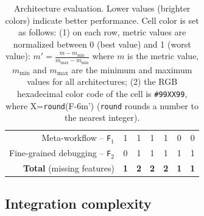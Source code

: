 \documentclass[preprint,3p,twocolumn]{elsarticle}
\newcommand{\correction}[1]{\color{blue}#1\color{black}\xspace}
\begin{document}
\begin{table}
\begin{tabular}{rcccccc}
  Meta-workflow  -- \texttt{\correction{F}$_1$}    & \cellcolor[HTML]{999999}1
                                     & \cellcolor[HTML]{999999}1
                                     & \cellcolor[HTML]{999999}\correction{1}
                                     & \cellcolor[HTML]{999999}1
                                     & \cellcolor[HTML]{99FF99}0
                                     & \cellcolor[HTML]{99FF99}0\\
  Fine-grained debugging -- \texttt{\correction{F}$_2$}   & \cellcolor[HTML]{99FF99}0
                                     & \cellcolor[HTML]{999999}1
                                     & \cellcolor[HTML]{999999}1
                                     & \cellcolor[HTML]{999999}1
                                     & \cellcolor[HTML]{999999}1
                                     & \cellcolor[HTML]{999999}1\\
  \textbf{Total} (missing features) & \cellcolor[HTML]{99FF99}\textbf{1}
                                     & \cellcolor[HTML]{999999}\textbf{2}
                                     & \cellcolor[HTML]{999999}\textbf{\correction{2}}
                                     & \cellcolor[HTML]{999999}\textbf{2}
                                     & \cellcolor[HTML]{99FF99}\textbf{1}
                                     & \cellcolor[HTML]{99FF99}\textbf{1}\\
\end{tabular}

\caption{Architecture evaluation. Lower values (brighter colors) indicate better performance. Cell color is set as follows: (1) on each row, metric values are
  normalized between 0 (best value) and 1 (worst value):
  $m'=\frac{m-m_{\mathrm{min}}}{m_{\mathrm{max}}-m_{\mathrm{min}}}$ where
  $m$ is the metric value, $m_{\mathrm{min}}$ and $m_{\mathrm{max}}$
  are the minimum and maximum values for all architectures; (2) the RGB hexadecimal color code of the cell
  is \texttt{\#99XX99}, where X=\texttt{round}(F-6m') (\texttt{round} rounds a number to the nearest integer). }
\label{table:evaluation}
\end{table}

\subsection{\correction{Integration complexity}}
\end{document}
